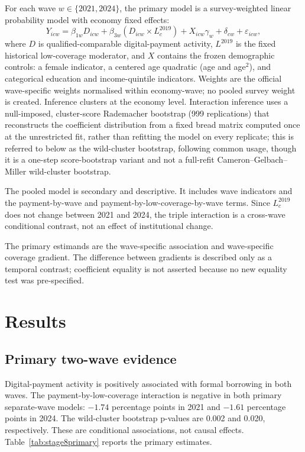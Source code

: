 For each wave $w\in\{2021,2024\}$, the primary model is a survey-weighted linear
probability model with economy fixed effects:
\[
Y_{icw}=\beta_{1w}D_{icw}+\beta_{3w}(D_{icw}\times L_c^{2019})
+X_{icw}\gamma_w+\delta_{cw}+\varepsilon_{icw},
\]
where $D$ is qualified-comparable digital-payment activity, $L^{2019}$ is the fixed
historical low-coverage moderator, and $X$ contains the frozen demographic controls: a
female indicator, a centered age quadratic (age and age$^2$), and categorical education
and income-quintile indicators.
Weights are the official wave-specific weights normalised within economy-wave; no pooled
survey weight is created. Inference clusters at the economy level. Interaction inference
uses a null-imposed, cluster-score Rademacher bootstrap (999 replications) that
reconstructs the coefficient distribution from a fixed bread matrix computed once at the
unrestricted fit, rather than refitting the model on every replicate; this is referred to
below as the wild-cluster bootstrap, following common usage, though it is a one-step
score-bootstrap variant and not a full-refit Cameron--Gelbach--Miller wild-cluster
bootstrap.

The pooled model is secondary and descriptive. It includes wave indicators and the
payment-by-wave and payment-by-low-coverage-by-wave terms. Since $L_c^{2019}$ does not
change between 2021 and 2024, the triple interaction is a cross-wave conditional contrast,
not an effect of institutional change.

The primary estimands are the wave-specific association and wave-specific coverage
gradient. The difference between gradients is described only as a temporal contrast;
coefficient equality is not asserted because no new equality test was pre-specified.

\section{Results}

\subsection{Primary two-wave evidence}

Digital-payment activity is positively associated with formal borrowing in both waves.
The payment-by-low-coverage interaction is negative in both primary separate-wave models:
$-1.74$ percentage points in 2021 and $-1.61$ percentage points in 2024. The wild-cluster
bootstrap p-values are 0.002 and 0.020, respectively. These are conditional associations,
not causal effects. Table~\ref{tab:stage8primary} reports the primary estimates.

